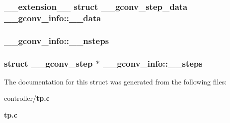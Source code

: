 \subsubsection[{\_\-\_\-data}]{\setlength{\rightskip}{0pt plus 5cm}\_\-\_\-extension\_\-\_\- struct {\bf \_\-\_\-gconv\_\-step\_\-data} {\bf \_\-\_\-gconv\_\-info::\_\-\_\-data}}\label{struct____gconv__info_a82f4ba2aecfbee22ce8581a92283db3a}
\subsubsection[{\_\-\_\-nsteps}]{ {\bf \_\-\_\-gconv\_\-info::\_\-\_\-nsteps}}\label{struct____gconv__info_aac71da388558fb03986599ca33b639c4}
\subsubsection[{\_\-\_\-steps}]{\setlength{\rightskip}{0pt plus 5cm}struct {\bf \_\-\_\-gconv\_\-step} $\ast$ {\bf \_\-\_\-gconv\_\-info::\_\-\_\-steps}}\label{struct____gconv__info_abc803bd2cf88260972f0c8135e439757}


The documentation for this struct was generated from the following files:\begin{DoxyCompactItemize}
\item 
controller/{\bf tp.c}\item 
{\bf tp.c}\end{DoxyCompactItemize}
